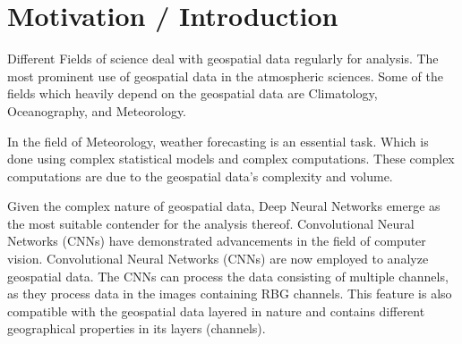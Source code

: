 \clearpage
\cleardoublepage

\chapter{Motivation / Introduction}

Different Fields of science deal with geospatial data regularly for analysis.
The most prominent use of geospatial data in the atmospheric sciences. Some of the fields
which heavily depend on the geospatial data are Climatology, Oceanography, and Meteorology.

In the field of Meteorology, weather forecasting is an essential task. Which is done using complex statistical models and complex computations.
These complex computations are due to the geospatial data's
complexity and volume.

Given the complex nature of geospatial data,
Deep Neural Networks emerge as the most suitable contender for the analysis thereof. Convolutional Neural Networks (CNNs) have demonstrated advancements in the field of computer
vision. Convolutional Neural Networks (CNNs) are now employed to analyze geospatial data. The CNNs can process the data consisting of multiple channels, as they process
data in the images containing RBG channels. This feature is also compatible with the geospatial data layered in nature and contains different geographical properties in its layers
(channels).

